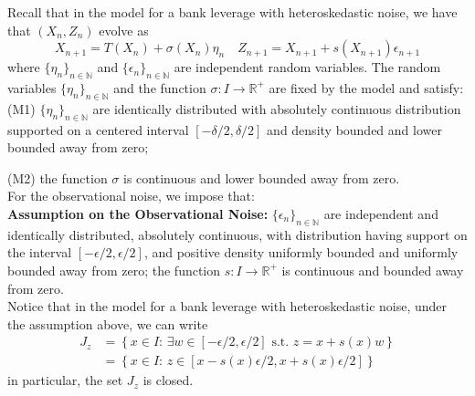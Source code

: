 \documentclass{article}
\newcommand{\1}{\mathbbm{1}}
\newcommand{\N}{\mathbb N}
\newcommand{\R}{\mathbb R}
\begin{document}
Recall that in the model for a bank leverage with heteroskedastic noise, we have that $(X_n,Z_n)$ evolve as
\[
X_{n+1}=T(X_n)+\sigma(X_n) \eta_n \quad Z_{n+1}=X_{n+1}+s(X_{n+1})\epsilon_{n+1}
\]
where $\{\eta_n\}_{n\in \N}$ and $\{\epsilon_n\}_{n\in \N}$ are independent random variables. The random variables $\{\eta_n\}_{n\in \N}$ and the function $\sigma: I\rightarrow \R^+$ are fixed by the model and satisfy: 
\\

(M1) $\{\eta_n\}_{n\in \N}$ are identically distributed with absolutely continuous distribution supported on a centered interval $[-\delta/2,\delta/2]$ and density bounded and lower bounded away from zero; 

(M2) the function $\sigma$ is continuous and lower bounded away from zero. 
\\

For the observational noise, we impose that:\\

{\bf Assumption on the Observational Noise:} $\{\epsilon_n\}_{n\in \N}$ are independent and identically distributed, absolutely continuous, with distribution having support on the interval $[-\epsilon/2,\epsilon/2]$, and positive density uniformly bounded and uniformly bounded away from zero; the function $s:I\rightarrow \R^+$ is continuous and bounded away from zero. 
\\

Notice that in the model for a bank leverage with heteroskedastic noise, under the assumption above, we can write
\begin{align*}
J_z&=\left\{x\in I:\,\exists w\in[-\epsilon/2,\epsilon/2]\,\,\mbox{s.t.}\,\, z=x+s(x)w\right\}\\
&=\left\{x\in I:\,z\in[x-s(x)\epsilon/2,x+s(x)\epsilon/2]\right\}
\end{align*}
in particular, the set $J_z$ is closed.
\end{document}
